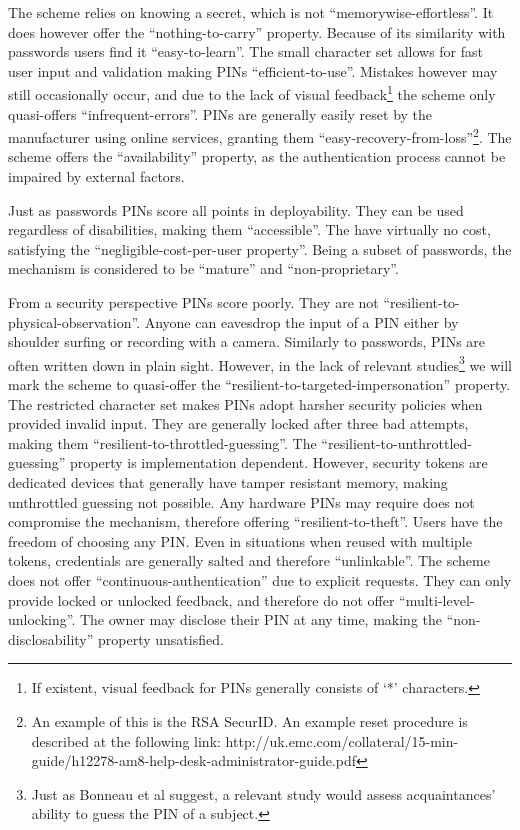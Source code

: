 	The scheme relies on knowing a secret, which is not ``memorywise-effortless''. It does however offer the ``nothing-to-carry'' property. Because of its similarity with passwords users find it ``easy-to-learn''. The small character set allows for fast user input and validation making PINs ``efficient-to-use''. Mistakes however may still occasionally occur, and due to the lack of visual feedback\footnote{If existent, visual feedback for PINs generally consists of `*' characters.} the scheme only quasi-offers ``infrequent-errors''. PINs are generally easily reset by the manufacturer using online services, granting them ``easy-recovery-from-loss''\footnote{An example of this is the RSA SecurID. An example reset procedure is described at the following link: http://uk.emc.com/collateral/15-min-guide/h12278-am8-help-desk-administrator-guide.pdf}. The scheme offers the ``availability'' property, as the authentication process cannot be impaired by external factors.
	
	Just as passwords PINs score all points in deployability. They can be used regardless of disabilities, making them ``accessible''. The have virtually no cost, satisfying the ``negligible-cost-per-user property''. Being a subset of passwords, the mechanism is considered to be ``mature'' and ``non-proprietary''.
	
	From a security perspective PINs score poorly. They are not ``resilient-to-physical-observation''. Anyone can eavesdrop the input of a PIN either by shoulder surfing or recording with a camera. Similarly to passwords, PINs are often written down in plain sight. However, in the lack of relevant studies\footnote{Just as Bonneau et al suggest, a relevant study would assess acquaintances' ability to guess the PIN of a subject.} we will mark the scheme to quasi-offer the ``resilient-to-targeted-impersonation'' property. The restricted character set makes PINs adopt harsher security policies when provided invalid input. They are generally locked after three bad attempts, making them ``resilient-to-throttled-guessing''. The ``resilient-to-unthrottled-guessing'' property is implementation dependent. However, security tokens are dedicated devices that generally have tamper resistant memory, making unthrottled guessing not possible. Any hardware PINs may require does not compromise the mechanism, therefore offering ``resilient-to-theft''. Users have the freedom of choosing any PIN. Even in situations when reused with multiple tokens, credentials are generally salted and therefore ``unlinkable''. The scheme does not offer ``continuous-authentication'' due to explicit requests. They can only provide locked or unlocked feedback, and therefore do not offer ``multi-level-unlocking''. The owner may disclose their PIN at any time, making the ``non-disclosability'' property unsatisfied. 
	
